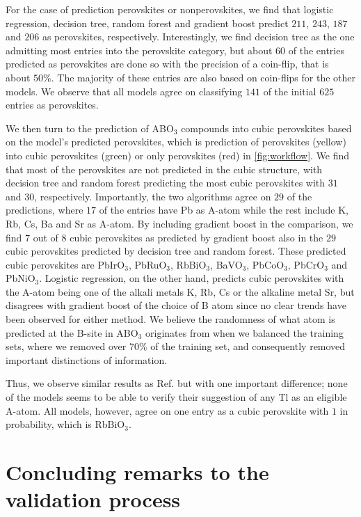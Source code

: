 For the case of prediction perovskites or nonperovskites, we find that logistic regression, decision tree, random forest and gradient boost predict $211$, $243$, $187$ and $206$ as perovskites, respectively. Interestingly, we find decision tree as the one admitting most entries into the perovskite category, but about $60$ of the entries predicted as perovskites are done so with the precision of a coin-flip, that is about $50\%$. The majority of these entries are also based on coin-flips for the other models. We observe that all models agree on classifying $141$ of the initial $625$ entries as perovskites.

We then turn to the prediction of ABO$_3$ compounds into cubic perovskites based on the model's predicted perovskites, which is prediction of perovskites (yellow) into cubic perovskites (green) or only perovskites (red) in \autoref{fig:workflow}. We find that most of the perovskites are not predicted in the cubic structure, with decision tree and random forest predicting the most cubic perovskites with $31$ and $30$, respectively. Importantly, the two algorithms agree on $29$ of the predictions, where $17$ of the entries have Pb as A-atom while the rest include K, Rb, Cs, Ba and Sr as A-atom. By including gradient boost in the comparison, we find $7$ out of $8$ cubic perovskites as predicted by gradient boost also in the $29$ cubic perovskites predicted by decision tree and random forest. These predicted cubic perovskites are PbIrO$_3$, PbRuO$_3$, RbBiO$_3$, BaVO$_3$, PbCoO$_3$, PbCrO$_3$ and PbNiO$_3$. Logistic regression, on the other hand, predicts cubic perovskites with the A-atom being one of the alkali metals K, Rb, Cs or the alkaline metal Sr, but disagrees with gradient boost of the choice of B atom since no clear trends have been observed for either method. We believe the randomness of what atom is predicted at the B-site in ABO$_3$ originates from when we balanced the training sets, where we removed over $70\%$ of the training set, and consequently removed important distinctions of information.

Thus, we observe similar results as Ref. \cite{Balachandran2018} but with one important difference; none of the models seems to be able to verify their suggestion of any Tl as an eligible A-atom. All models, however, agree on one entry as a cubic perovskite with $1$ in probability, which is RbBiO$_3$.

\section{Concluding remarks to the validation process}

